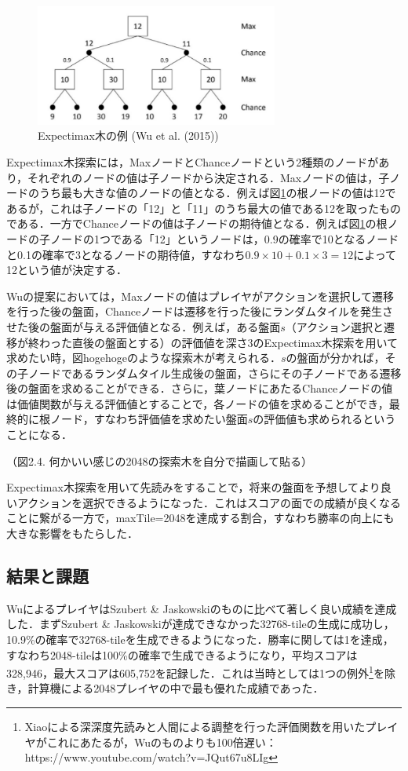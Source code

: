\documentclass{suribt}
\begin{document}
\begin{figure}[t]
	\begin{center}
	\includegraphics[width=8cm]{figure_003.png}
	\caption{Expectimax木の例 (Wu et al. (2015))}
	\label{figure_003}
	\end{center}
\end{figure}

Expectimax木探索には，MaxノードとChanceノードという2種類のノードがあり，それぞれのノードの値は子ノードから決定される．Maxノードの値は，子ノードのうち最も大きな値のノードの値となる．例えば図\ref{figure_003}の根ノードの値は12であるが，これは子ノードの「12」と「11」のうち最大の値である12を取ったものである．一方でChanceノードの値は子ノードの期待値となる．例えば図\ref{figure_003}の根ノードの子ノードの1つである「12」というノードは，0.9の確率で10となるノードと0.1の確率で3となるノードの期待値，すなわち$0.9 \times 10 + 0.1 \times 3 = 12$によって12という値が決定する．

Wuの提案においては，Maxノードの値はプレイヤがアクションを選択して遷移を行った後の盤面，Chanceノードは遷移を行った後にランダムタイルを発生させた後の盤面が与える評価値となる．例えば，ある盤面$s$（アクション選択と遷移が終わった直後の盤面とする）の評価値を深さ3のExpectimax木探索を用いて求めたい時，図hogehogeのような探索木が考えられる．$s$の盤面が分かれば，その子ノードであるランダムタイル生成後の盤面，さらにその子ノードである遷移後の盤面を求めることができる．さらに，葉ノードにあたるChanceノードの値は価値関数が与える評価値とすることで，各ノードの値を求めることができ，最終的に根ノード，すなわち評価値を求めたい盤面$s$の評価値も求められるということになる．

（図2.4. 何かいい感じの2048の探索木を自分で描画して貼る）

Expectimax木探索を用いて先読みをすることで，将来の盤面を予想してより良いアクションを選択できるようになった．これはスコアの面での成績が良くなることに繋がる一方で，maxTile=2048を達成する割合，すなわち勝率の向上にも大きな影響をもたらした．

\subsection{結果と課題}
WuによるプレイヤはSzubert \& Jaskowskiのものに比べて著しく良い成績を達成した．まずSzubert \& Jaskowskiが達成できなかった32768-tileの生成に成功し，10.9\%の確率で32768-tileを生成できるようになった．勝率に関しては1を達成，すなわち2048-tileは100\%の確率で生成できるようになり，平均スコアは328,946，最大スコアは605,752を記録した．これは当時としては1つの例外\footnote{Xiaoによる深深度先読みと人間による調整を行った評価関数を用いたプレイヤがこれにあたるが，Wuのものよりも100倍遅い：https://www.youtube.com/watch?v=JQut67u8LIg}を除き，計算機による2048プレイヤの中で最も優れた成績であった．
\end{document}
